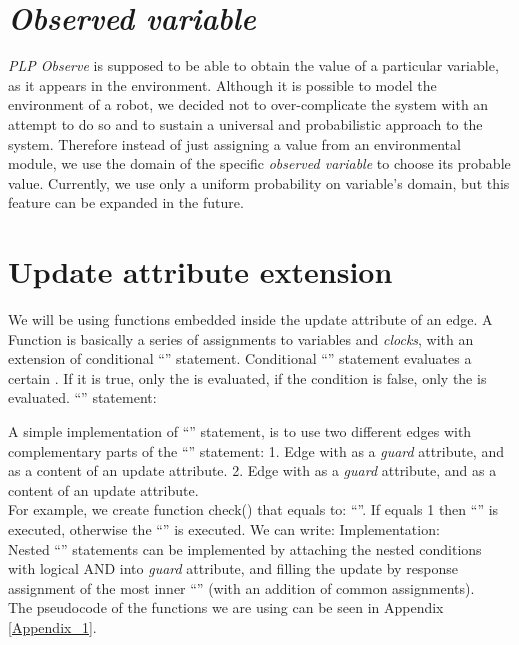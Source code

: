 \section{\textit{Observed variable} \label{plp_to_pta_observed_variable}}
\textit{PLP Observe} is supposed to be able to obtain the value of a particular variable, as it appears in the environment. Although it is possible to model the environment of a robot, we decided not to over-complicate the system with an attempt to do so and to sustain a universal and probabilistic approach to the system. Therefore instead of just assigning a value from an environmental module, we use the domain of the specific \textit{observed variable} to choose its probable value. Currently, we use only a uniform probability on variable's domain, but this feature can be expanded in the future. \\
\section{Update attribute extension \label{plp_to_pta_update_attribute_extension}}
We will be using functions embedded inside the update attribute of an edge. A Function is basically a series of assignments to variables and \textit{clocks}, with an extension of conditional “” statement. Conditional “” statement evaluates a certain . If it is true, only the  is evaluated, if the condition is false, only the  is evaluated. “” statement:\\
 \begin{center} \end{center}
A simple implementation of “” statement, is to use two different edges with complementary parts of the “” statement: 1. Edge with  as a \textit{guard} attribute, and  as a content of an update attribute. 2. Edge with  as a \textit{guard} attribute, and  as a content of an update attribute.\\
For example, we create function check() that equals to: “”. If  equals 1 then  “” is executed, otherwise the  “” is executed. We can write:  Implementation: \\
 Nested “” statements can be implemented by attaching the nested conditions with logical AND into \textit{guard} attribute, and filling the update by response assignment of the most inner “” (with an addition of common assignments).\\
The pseudocode of the functions we are using can be seen in Appendix \ref{Appendix_1}.\\
